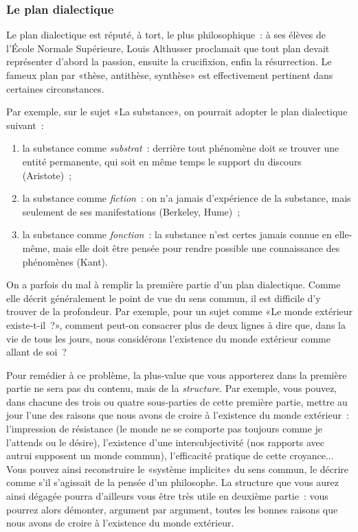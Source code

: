 \documentclass[a4paper,11pt]{article}
\begin{document}
\subsubsection{Le plan dialectique}

Le plan dialectique est réputé, à tort, le plus philosophique~: à ses
élèves de l'École Normale Supérieure, Louis Althusser proclamait que
tout plan devait représenter d'abord la passion, ensuite la crucifixion,
enfin la résurrection. Le fameux plan par «thèse, antithèse, synthèse»
est effectivement pertinent dans certaines circonstances.

\par

Par exemple, sur le sujet «La substance», on pourrait adopter le plan
dialectique suivant~:
\begin{enumerate}
\item la substance comme \emph{substrat}~: derrière tout phénomène doit
  se trouver une entité permanente, qui soit en même temps le support du
  discours (Aristote)~;
\item la substance comme \emph{fiction}~: on n'a jamais d'expérience de
  la substance, mais seulement de ses manifestations (Berkeley, Hume)~;
\item la substance comme \emph{fonction}~: la substance n'est certes
  jamais connue en elle-même, mais elle doit être pensée pour rendre
  possible une connaissance des phénomènes (Kant).
\end{enumerate}

\par

On a parfois du mal à remplir la première partie d'un plan dialectique.
Comme elle décrit généralement le point de vue du sens commun, il est
difficile d'y trouver de la profondeur. Par exemple, pour un sujet comme
«Le monde extérieur existe-t-il~?», comment peut-on consacrer plus de
deux lignes à dire que, dans la vie de tous les jours, nous considérons
l'existence du monde extérieur comme allant de soi~?

\par

Pour remédier à ce problème, la plus-value que vous apporterez dans la
première partie ne sera pas du contenu, mais de la \emph{structure}. Par
exemple, vous pouvez, dans chacune des trois ou quatre sous-parties de
cette première partie, mettre au jour l'une des raisons que nous avons
de croire à l'existence du monde extérieur~: l'impression de résistance
(le monde ne se comporte pas toujours comme je l'attends ou le désire),
l'existence d'une intersubjectivité (nos rapports avec autrui supposent
un monde commun), l'efficacité pratique de cette croyance... Vous pouvez
ainsi reconstruire le «système implicite» du sens commun, le décrire
comme s'il s'agissait de la pensée d'un philosophe. La structure que
vous aurez ainsi dégagée pourra d'ailleurs vous être très utile en
deuxième partie~: vous pourrez alors démonter, argument par argument,
toutes les bonnes raisons que nous avons de croire à l'existence du
monde extérieur.
\end{document}
